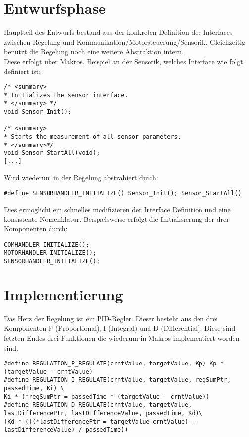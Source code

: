\section{Entwurfsphase}
Hauptteil des Entwurfs bestand aus der konkreten Definition der Interfaces zwischen Regelung und Kommunikation/Motorsteuerung/Sensorik. Gleichzeitig benutzt die Regelung noch eine weitere Abstraktion intern.\\
Diese erfolgt über Makros. Beispiel an der Sensorik, welches Interface wie folgt definiert ist:
\begin{lstlisting}[frame=single, caption=Interne Abstrahierung des Sensorik Interface]
/* <summary>
* Initializes the sensor interface.
* </summary> */
void Sensor_Init();

/* <summary>
* Starts the measurement of all sensor parameters.
* </summary>*/
void Sensor_StartAll(void);
[...]
\end{lstlisting}

Wird wiederum in der Regelung abstrahiert durch:
\begin{lstlisting}[frame=single, caption=Interne Abstrahierung des Sensorik Interface]
#define SENSORHANDLER_INITIALIZE() Sensor_Init(); Sensor_StartAll()
\end{lstlisting}
Dies ermöglicht ein schnelles modifizieren der Interface Definition und eine konsistente Nomenklatur. Beispielsweise erfolgt die Initialisierung der drei Komponenten durch:
\begin{lstlisting}[frame=single, caption=Interne Abstrahierung des Sensorik Interface]
COMHANDLER_INITIALIZE();
MOTORHANDLER_INITIALIZE();
SENSORHANDLER_INITIALIZE();
\end{lstlisting}

\section{Implementierung}
Das Herz der Regelung ist ein PID-Regler. Dieser besteht aus den drei Komponenten P (Proportional), I (Integral) und D (Differential).\cite{regl} Diese sind letzten Endes drei Funktionen die wiederum in Makros implementiert worden sind.\\

\begin{lstlisting}[frame=single, caption=Interne Abstrahierung des Sensorik Interface]
#define REGULATION_P_REGULATE(crntValue, targetValue, Kp) Kp * (targetValue - crntValue)
#define REGULATION_I_REGULATE(crntValue, targetValue, regSumPtr, passedTime, Ki) \
Ki * (*regSumPtr = passedTime * (targetValue - crntValue))
#define REGULATION_D_REGULATE(crntValue, targetValue, lastDifferencePtr, lastDifferenceValue, passedTime, Kd)\
(Kd * (((*lastDifferencePtr = targetValue-crntValue) - lastDifferenceValue) / passedTime))
\end{lstlisting}

